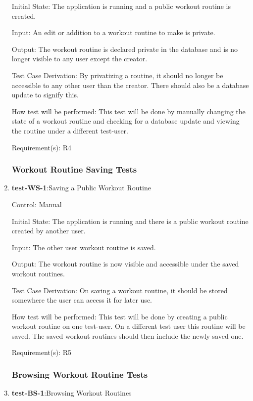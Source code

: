 \documentclass[12pt, titlepage]{article}
\begin{document}
\begin{enumerate}
		Initial State: The application is running and a public workout routine is created.
		
		Input: An edit or addition to a workout routine to make is private.
		
		Output: The workout routine is declared private in the database and is no longer visible to any user except the creator.
		
		Test Case Derivation: By privatizing a routine, it should no longer be accessible to any other user than the creator. There should also be a database update to signify this.
		
		How test will be performed: This test will be done by manually changing the state of a workout routine and checking for a database update and viewing the routine under a different test-user.
		
		Requirement(s): R4
		
		\subsubsection{Workout Routine Saving Tests}
	
		\item{\textbf{test-WS-1}}:Saving a Public Workout Routine
		
		Control: Manual
		
		Initial State: The application is running and there is a public workout routine created by another user.
		
		Input: The other user workout routine is saved.
		
		Output: The workout routine is now visible and accessible under the saved workout routines.
		
		Test Case Derivation: On saving a workout routine, it should be stored somewhere the user can access it for later use.
		
		How test will be performed: This test will be done by creating a public workout routine on one test-user. On a different test user this routine will be saved. The saved workout routines should then include the newly saved one.
		
		Requirement(s): R5
		
		\subsubsection{Browsing Workout Routine Tests}
		\item{\textbf{test-BS-1}}:Browsing Workout Routines
		

\end{enumerate}
\end{document}
